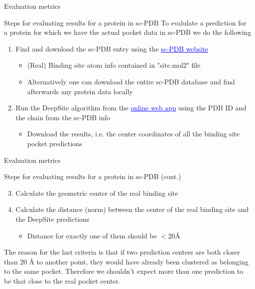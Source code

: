 \documentclass{beamer}
\newcommand{\link}[2]{\href{#1}{\textcolor{blue}{\underline{#2}}}}
\begin{document}
\begin{frame}{Evaluation metrics}
  \begin{block}{Steps for evaluating results for a protein in sc-PDB}
    To evalulate a prediction for a protein for which we have the actual pocket data in sc-PDB we do the following
    \begin{enumerate}
      \item Find and download the sc-PDB entry using the \link{http://bioinfo-pharma.u-strasbg.fr/}{sc-PDB website}
      \begin{itemize}
        \item (Real) Binding site atom info contained in "site.mol2" file
        \item Alternatively one can download the entire sc-PDB database and find afterwards any protein data locally
      \end{itemize}
      \item Run the DeepSite algorithm from the \link{https://www.playmolecule.com/deepsite/}{online web app} using the PDB ID and the chain from the sc-PDB info
      \begin{itemize}
        \item Download the results, i.e. the center coordinates of all the binding site pocket predictions
      \end{itemize}
    \end{enumerate}
  \end{block}
\end{frame}

\begin{frame}{Evaluation metrics}
  \begin{block}{Steps for evaluating results for a protein in sc-PDB (cont.)}
    \begin{enumerate}
      \setcounter{enumi}{2}
      \item Calculate the geometric center of the real binding site
      \item Calculate the distance (norm) between the center of the real binding site and the DeepSite predictions
      \begin{itemize}
        \item Distance for exactly one of them should be $<20$\AA
      \end{itemize}
    \end{enumerate}
    The reason for the last criteria is that if two prediction centers are both closer than 20 \AA\; to another point, they would have already been clustered as belonging to the same pocket.
    Therefore we shouldn't expect more than one prediction to be that close to the real pocket center.
  \end{block}
\end{frame}
\end{document}
